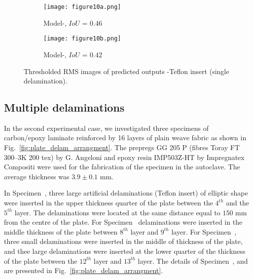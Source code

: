 \begin{figure} [!h]
	\begin{subfigure}[b]{.48\textwidth}
		\centering
		\texttt{[image: figure10a.png]}
		\caption{Model-, \(IoU\) = \(0.46\)}
		\label{fig:RMS_threshold_CFRP_Teflon_3o_saeed}
	\end{subfigure}
	\hfill
	\begin{subfigure}[b]{.48\textwidth}
		\centering
		\texttt{[image: figure10b.png]}
		\caption{Model-, \(IoU\) = \(0.42\)} 
		\label{fig:RMS_threshold_CFRP_Teflon_3o_ijjeh}
	\end{subfigure}
	\caption{Thresholded RMS images of predicted outputs -Teflon insert (single delamination).}
	\label{fig:RMS_threshold_CFRP_Teflon_3o_images}
\end{figure} 
\clearpage
\subsection{Multiple delaminations}
In the second experimental case, we investigated three specimens of carbon/epoxy laminate reinforced by 16 layers of plain weave fabric as shown in Fig.~\ref{fig:plate_delam_arrangment}. 
The prepregs GG 205 P (fibres Toray FT 300–3K 200 tex) by G. Angeloni and epoxy resin IMP503Z‐HT by Impregnatex Compositi were used for the fabrication of the specimen in the autoclave. 
The average thickness was \(3.9 \pm 0.1\) mm.

In Specimen~, three large artificial delaminations (Teflon insert) of elliptic shape were inserted in the upper thickness quarter of the plate between the \(4^{th}\) and the \(5^{th}\) layer.
The delaminations were located at the same distance equal to \(150\) mm from the centre of the plate.
For Specimen~ delaminations were inserted in the middle thickness of the plate between \(8^{th}\) layer and \(9^{th}\) layer.
For Specimen~, three small delaminations were inserted in the middle of thickness of the plate, and thee large delaminations were inserted at the lower quarter of the thickness of the plate between the \(12^{th}\) layer and \(13^{th}\) layer.
The details of Specimen~,  and  are presented in Fig.~\ref{fig:plate_delam_arrangment}.

